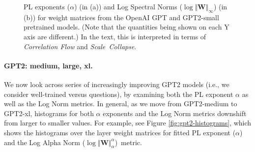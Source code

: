 \begin{figure}[htb]
    \centering
    \quad
    \caption{PL exponents ($\alpha$) (in (a)) and Log Spectral Norms ($\log\Vert\mathbf{W}\Vert_{\infty}$) (in (b)) for weight matrices from the OpenAI GPT and GPT2-small pretrained models.  (Note that the quantities being shown on each Y axis are different.)
             In the text, this is interpreted in terms of \emph{Correlation Flow} and \emph{Scale~Collapse}.
            }
    \label{fig:gpt-alpha-layers}
\end{figure}


\vspace{-1mm}
\paragraph{GPT2: medium, large, xl.} 

We now look across series of increasingly improving GPT2 models (i.e., we consider well-trained versus  questions), by examining both the PL exponent $\alpha$ as well as the Log Norm metrics.  
In general, as we move from GPT2-medium to GPT2-xl, histograms for both $\alpha$ exponents and the Log Norm metrics downshift from larger to smaller values. 
For example, see Figure \ref{fig:gpt2-histograms}, which shows the histograms over the layer weight matrices for fitted PL exponent ($\alpha$) and the Log Alpha Norm ($\log\Vert\mathbf{W}\Vert_{\alpha}^{\alpha}$)~metric.

